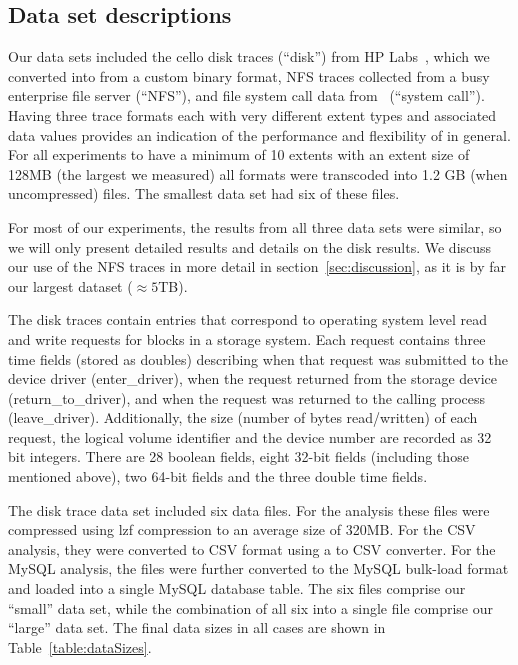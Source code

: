 \subsection{Data set descriptions}

Our data sets included the cello disk traces (``disk'') from HP Labs~\cite{SRT},
which we converted into \DataSeries{} from a custom binary format,
NFS traces collected from 
a busy enterprise file server (``NFS''), and file system call data
from~\cite{Soules05} (``system call''). 
Having three trace formats
each with very different extent types and associated data values provides
an indication of the performance and flexibility of \DataSeries{}
 in general.  For all
experiments to have a minimum of 10 extents with an extent size of
128MB (the largest we measured) all formats were transcoded into 1.2
GB (when uncompressed) files.  The smallest data set had six of these
files. 

For most of our experiments, the results from all three data sets were
similar, so we will only present detailed results and details on the
disk results. 
We discuss our
use of the NFS traces in more detail in section~\ref{sec:discussion}, as 
it is by far our largest dataset ($\approx5$TB).


The disk traces contain entries that correspond to operating system
level read and write requests for blocks in a storage system.  Each
request contains three time fields (stored as doubles) describing when that request was
submitted to the device driver (enter\_driver), when the request
returned from the storage device (return\_to\_driver), and when the
request was returned to the calling process (leave\_driver).  
Additionally, the size (number of
bytes read/written) of each request, the logical volume identifier and
the device number are recorded as 32 bit integers. 
There are 28 boolean fields, eight 32-bit fields
 (including those mentioned above), two 64-bit fields and 
the three  double time fields.

The disk trace data set included six data files. For the \DataSeries{} 
analysis these files were compressed using lzf compression
to an average size of 320MB.  For the CSV analysis, they were
converted to CSV format using a \DataSeries{} to CSV converter.  For the
MySQL analysis, the files were further converted to the MySQL bulk-load
format and loaded into a single MySQL database table. The six files comprise
our ``small'' data set, while the combination of all six into a single
file comprise our ``large'' data set. The final data sizes
in all cases are shown in Table~\ref{table:dataSizes}. 

